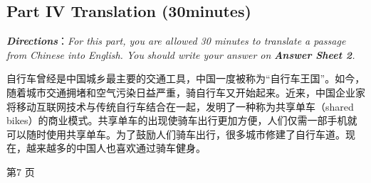 \documentclass[UTF8,11pt]{ctexart}
\begin{document}
\subsection*{\textbf{Part IV} \textbf{Translation} \textbf{(30minutes)}}


\textbf{\textit{Directions}}：\textit{For this part, you are allowed 30 minutes to translate a passage from Chinese into English. You} \textit{should write your answer on}\textbf{\textit{ Answer Sheet 2}}\textit{.}


自行车曾经是中国城乡最主要的交通工具，中国一度被称为“自行车王国”。如今，随着城市交通拥堵和空气污染日益严重，骑自行车又开始起来。近来，中国企业家将移动互联网技术与传统自行车结合在一起，发明了一种称为共享单车（shared bikes）的商业模式。共享单车的出现使骑车出行更加方便，人们仅需一部手机就可以随时使用共享单车。为了鼓励人们骑车出行，很多城市修建了自行车道。现在，越来越多的中国人也喜欢通过骑车健身。


第7 页
\end{document}
